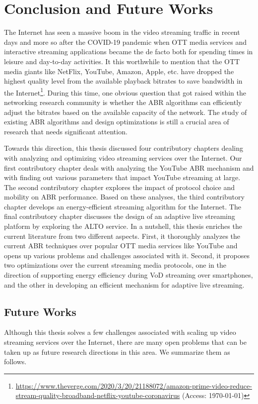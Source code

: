 \chapter{Conclusion and Future Works}
The Internet has seen a massive boom in the video streaming traffic in recent days and more so after the COVID-19 pandemic when \ac{OTT} media services and interactive streaming applications became the de facto both for spending times in leisure and day-to-day activities. It this worthwhile to mention that the \ac{OTT} media giants like NetFlix, YouTube, Amazon, Apple, etc. have dropped the highest quality level from the available playback bitrates to save bandwidth in the Internet\footnote{\url{https://www.theverge.com/2020/3/20/21188072/amazon-prime-video-reduce-stream-quality-broadband-netflix-youtube-coronavirus} (Access: \today)}. During this time, one obvious question that got raised within the networking research community is whether the \ac{ABR} algorithms can efficiently adjust the bitrates based on the available capacity of the network. The study of existing \ac{ABR} algorithms and design optimizations is still a crucial area of research that needs significant attention.  

Towards this direction, this thesis discussed four contributory chapters dealing with analyzing and optimizing video streaming services over the Internet. Our first contributory chapter deals with analyzing the YouTube \ac{ABR} mechanism and with finding out various parameters that impact YouTube streaming at large. The second contributory chapter explores the impact of protocol choice and mobility on \ac{ABR} performance. Based on these analyses, the third contributory chapter develops an energy-efficient streaming algorithm for the Internet. The final contributory chapter discusses the design of an adaptive live streaming platform by exploring the \ac{ALTO} service. In a nutshell, this thesis enriches the current literature from two different aspects. First, it thoroughly analyzes the current \ac{ABR} techniques over popular \ac{OTT} media services like YouTube and opens up various problems and challenges associated with it. Second, it proposes two optimizations over the current streaming media protocols, one in the direction of supporting energy efficiency during VoD streaming over smartphones, and the other in developing an efficient mechanism for adaptive live streaming.

\section{Future Works}
Although this thesis solves a few challenges associated with scaling up video streaming services over the Internet, there are many open problems that can be taken up as future research directions in this area. We summarize them as follows. 

